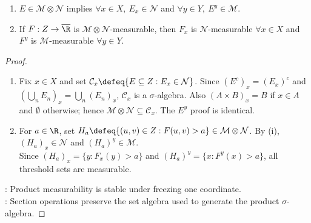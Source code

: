 \begin{lemma} \label{lem:product-measurable-sections} 
\begin{enumerate}[label=(\roman*)]
\setlength{\itemsep}{0pt}
\item $E\in\mathcal{M}\otimes\mathcal{N}$ implies $\forall x\in X,\ E_x\in\mathcal{N}$ and $\forall y\in Y,\ E^y\in\mathcal{M}$.
\item If $F:Z\to\overline{\R}$ is $\mathcal{M}\otimes\mathcal{N}$-measurable, then $F_x$ is $\mathcal{N}$-measurable $\forall x\in X$ and $F^y$ is $\mathcal{M}$-measurable $\forall y\in Y$.
\end{enumerate}
\begin{proof}
\begin{enumerate}[label=(\roman*)]
\setlength{\itemsep}{0pt}
\item Fix $x\in X$ and set $\mathcal{C}_x\defeq\{E\subseteq Z:E_x\in\mathcal{N}\}$. Since $(E^c)_x=(E_x)^c$ and $(\bigcup\limits_nE_n)_x=\bigcup\limits_n(E_n)_x$, $\mathcal{C}_x$ is a $\sigma$-algebra. Also $(A\times B)_x=B$ if $x\in A$ and $\emptyset$ otherwise; hence $\mathcal{M}\otimes\mathcal{N}\subseteq\mathcal{C}_x$. The $E^y$ proof is identical.
\item For $a\in\R$, set $H_a\defeq\{(u,v)\in Z:F(u,v)>a\}\in\mathcal{M}\otimes\mathcal{N}$. By (i), $(H_a)_x\in\mathcal{N}$ and $(H_a)^y\in\mathcal{M}$.\\
Since $(H_a)_x=\{y:F_x(y)>a\}$ and $(H_a)^y=\{x:F^y(x)>a\}$, all threshold sets are measurable.
\end{enumerate}
: Product measurability is stable under freezing one coordinate.\\
: Section operations preserve the set algebra used to generate the product $\sigma$-algebra.
\end{proof}
\end{lemma}

